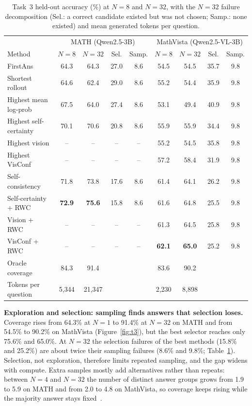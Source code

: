\documentclass{article}
\begin{document}
\begin{table}[t]
\centering
\caption{Task~3 held-out accuracy (\%) at $N{=}8$ and $N{=}32$, with the $N{=}32$ failure decomposition (Sel.: a correct candidate existed but was not chosen; Samp.: none existed) and mean generated tokens per question.}
\label{tab:t3}
\small
\setlength{\tabcolsep}{4pt}
\begin{tabular}{lcccc|cccc}
\toprule
 & \multicolumn{4}{c|}{MATH (Qwen2.5-3B)} & \multicolumn{4}{c}{MathVista (Qwen2.5-VL-3B)}\\
Method & $N{=}8$ & $N{=}32$ & Sel. & Samp. & $N{=}8$ & $N{=}32$ & Sel. & Samp.\\
\midrule
FirstAns & 64.3 & 64.3 & 27.0 & 8.6 & 54.5 & 54.5 & 35.7 & 9.8\\
Shortest rollout & 64.6 & 62.4 & 29.0 & 8.6 & 55.2 & 54.4 & 35.9 & 9.8\\
Highest mean log-prob & 67.5 & 64.0 & 27.4 & 8.6 & 53.1 & 49.4 & 40.9 & 9.8\\
Highest self-certainty & 70.1 & 70.6 & 20.8 & 8.6 & 55.9 & 55.9 & 34.4 & 9.8\\
Highest vision & -- & -- & -- & -- & 55.2 & 54.5 & 35.8 & 9.8\\
Highest VisConf & -- & -- & -- & -- & 57.2 & 58.4 & 31.9 & 9.8\\
Self-consistency & 71.8 & 73.8 & 17.6 & 8.6 & 61.4 & 64.1 & 26.2 & 9.8\\
Self-certainty + RWC & \textbf{72.9} & \textbf{75.6} & 15.8 & 8.6 & 61.6 & 64.8 & 25.5 & 9.8\\
Vision + RWC & -- & -- & -- & -- & 61.3 & 64.5 & 25.8 & 9.8\\
VisConf + RWC & -- & -- & -- & -- & \textbf{62.1} & \textbf{65.0} & 25.2 & 9.8\\
Oracle coverage & 84.3 & 91.4 & & & 83.6 & 90.2 & & \\
Tokens per question & 5,344 & 21,347 & & & 2,230 & 8,898 & & \\
\bottomrule
\end{tabular}
\end{table}

\textbf{Exploration and selection: sampling finds answers that selection loses.} Coverage rises from 64.3\% at $N{=}1$ to 91.4\% at $N{=}32$ on MATH and from 54.5\% to 90.2\% on MathVista (Figure~\ref{fig:t3}), but the best selector reaches only 75.6\% and 65.0\%. At $N{=}32$ the selection failures of the best methods (15.8\% and 25.2\%) are about twice their sampling failures (8.6\% and 9.8\%; Table~\ref{tab:t3}). Selection, not exploration, therefore limits repeated sampling, and the gap widens with compute. Extra samples mostly add alternatives rather than repeats: between $N{=}4$ and $N{=}32$ the number of distinct answer groups grows from 1.9 to 5.9 on MATH and from 2.0 to 4.8 on MathVista, so coverage keeps rising while the majority answer stays fixed~\cite{wang2023selfconsistency}.
\end{document}
